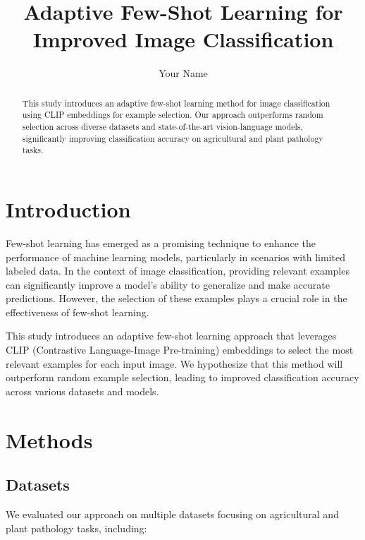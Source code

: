 \documentclass[12pt,a4paper]{article}
\title{Adaptive Few-Shot Learning for Improved Image Classification}
\author{Your Name}
\date{}
\begin{document}
\maketitle

\begin{abstract}
This study introduces an adaptive few-shot learning method for image classification using CLIP embeddings for example selection. Our approach outperforms random selection across diverse datasets and state-of-the-art vision-language models, significantly improving classification accuracy on agricultural and plant pathology tasks.
\end{abstract}

\section{Introduction}

Few-shot learning has emerged as a promising technique to enhance the performance of machine learning models, particularly in scenarios with limited labeled data. In the context of image classification, providing relevant examples can significantly improve a model's ability to generalize and make accurate predictions. However, the selection of these examples plays a crucial role in the effectiveness of few-shot learning.

This study introduces an adaptive few-shot learning approach that leverages CLIP (Contrastive Language-Image Pre-training) embeddings to select the most relevant examples for each input image. We hypothesize that this method will outperform random example selection, leading to improved classification accuracy across various datasets and models.

\section{Methods}

\subsection{Datasets}

We evaluated our approach on multiple datasets focusing on agricultural and plant pathology tasks, including:
\end{document}

